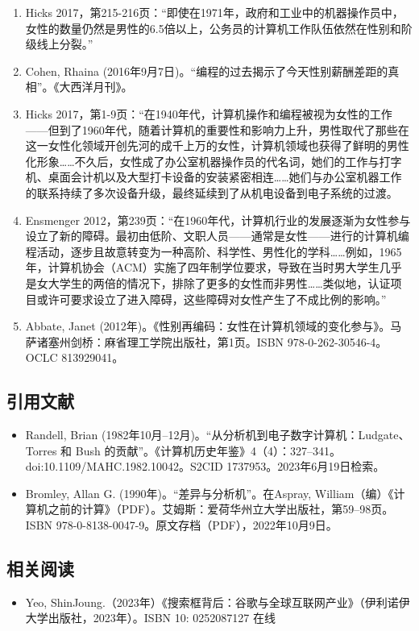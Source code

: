\begin{enumerate}
\item Hicks 2017，第215-216页：“即使在1971年，政府和工业中的机器操作员中，女性的数量仍然是男性的6.5倍以上，公务员的计算机工作队伍依然在性别和阶级线上分裂。”
\item Cohen, Rhaina (2016年9月7日)。“编程的过去揭示了今天性别薪酬差距的真相”。《大西洋月刊》。
\item Hicks 2017，第1-9页：“在1940年代，计算机操作和编程被视为女性的工作——但到了1960年代，随着计算机的重要性和影响力上升，男性取代了那些在这一女性化领域开创先河的成千上万的女性，计算机领域也获得了鲜明的男性化形象……不久后，女性成了办公室机器操作员的代名词，她们的工作与打字机、桌面会计机以及大型打卡设备的安装紧密相连……她们与办公室机器工作的联系持续了多次设备升级，最终延续到了从机电设备到电子系统的过渡。
\item Ensmenger 2012，第239页：“在1960年代，计算机行业的发展逐渐为女性参与设立了新的障碍。最初由低阶、文职人员——通常是女性——进行的计算机编程活动，逐步且故意转变为一种高阶、科学性、男性化的学科……例如，1965年，计算机协会（ACM）实施了四年制学位要求，导致在当时男大学生几乎是女大学生的两倍的情况下，排除了更多的女性而非男性……类似地，认证项目或许可要求设立了进入障碍，这些障碍对女性产生了不成比例的影响。”
\item Abbate, Janet (2012年)。《性别再编码：女性在计算机领域的变化参与》。马萨诸塞州剑桥：麻省理工学院出版社，第1页。ISBN 978-0-262-30546-4。OCLC 813929041。
\end{enumerate}
\subsection{引用文献}
\begin{itemize}
\item Randell, Brian (1982年10月–12月)。“从分析机到电子数字计算机：Ludgate、Torres 和 Bush 的贡献”。《计算机历史年鉴》4（4）：327–341。doi:10.1109/MAHC.1982.10042。S2CID 1737953。2023年6月19日检索。
\item Bromley, Allan G. (1990年)。“差异与分析机”。在Aspray, William（编）《计算机之前的计算》（PDF）。艾姆斯：爱荷华州立大学出版社，第59–98页。ISBN 978-0-8138-0047-9。原文存档（PDF），2022年10月9日。
\end{itemize}
\subsection{相关阅读}
\begin{itemize}
\item Yeo, ShinJoung.（2023年）《搜索框背后：谷歌与全球互联网产业》（伊利诺伊大学出版社，2023年）。ISBN 10: 0252087127 在线
\end{itemize}
